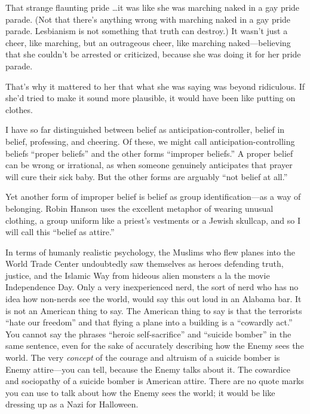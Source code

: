 {
 That strange flaunting pride \ldots it was like she was marching
naked in a gay pride parade. (Not that there's anything
wrong with marching naked in a gay pride parade. Lesbianism is not
something that truth can destroy.) It wasn't just a
cheer, like marching, but an outrageous cheer, like marching
naked---believing that she couldn't be arrested or
criticized, because she was doing it for her pride parade.}

{
 That's why it mattered to her that what she was
saying was beyond ridiculous. If she'd tried to make it
sound more plausible, it would have been like putting on clothes.}

\myendsectiontext


{
 I have so far distinguished between belief as
anticipation-controller, belief in belief, professing, and cheering. Of
these, we might call anticipation-controlling beliefs
``proper beliefs'' and the other
forms ``improper beliefs.'' A proper
belief can be wrong or irrational, as when someone genuinely
anticipates that prayer will cure their sick baby. But the other forms
are arguably ``not belief at all.''
}

{
 Yet another form of improper belief is belief as group
identification---as a way of belonging. Robin Hanson uses the excellent
metaphor of wearing unusual clothing, a group uniform like a
priest's vestments or a Jewish skullcap, and so I will
call this ``belief as attire.''}

{
 In terms of humanly realistic psychology, the Muslims who flew
planes into the World Trade Center undoubtedly saw themselves as heroes
defending truth, justice, and the Islamic Way from hideous alien
monsters a la the movie Independence Day. Only a very inexperienced
nerd, the sort of nerd who has no idea how non-nerds see the world,
would say this out loud in an Alabama bar. It is not an American thing
to say. The American thing to say is that the terrorists
``hate our freedom'' and that flying
a plane into a building is a ``cowardly
act.'' You cannot say the phrases
``heroic self-sacrifice'' and
``suicide bomber'' in the same
sentence, even for the sake of accurately describing how the Enemy sees
the world. The very \textit{concept} of the courage and altruism of a
suicide bomber is Enemy attire---you can tell, because the Enemy talks
about it. The cowardice and sociopathy of a suicide bomber is American
attire. There are no quote marks you can use to talk about how the
Enemy sees the world; it would be like dressing up as a Nazi for
Halloween.}

